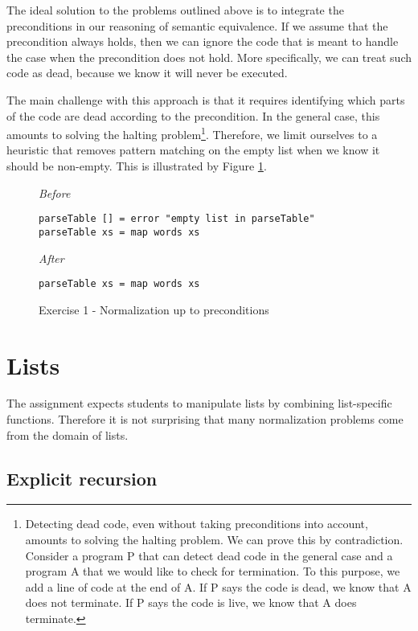 The ideal solution to the problems outlined above is to integrate the preconditions in our reasoning of semantic equivalence. If we assume that the precondition always holds, then we can ignore the code that is meant to handle the case when the precondition does not hold. More specifically, we can treat such code as dead, because we know it will never be executed.

The main challenge with this approach is that it requires identifying which parts of the code are dead according to the precondition. In the general case, this amounts to solving the halting problem\footnote{Detecting dead code, even without taking preconditions into account, amounts to solving the halting problem. We can prove this by contradiction. Consider a program P that can detect dead code in the general case and a program A that we would like to check for termination. To this purpose, we add a line of code at the end of A. If P says the code is dead, we know that A does not terminate. If P says the code is live, we know that A does terminate.}. Therefore, we limit ourselves to a heuristic that removes pattern matching on the empty list when we know it should be non-empty. This is illustrated by Figure \ref{fig:preconditions-remove-base-case}.

\begin{figure}
\centering
\emph{Before}
\begin{verbatim}
parseTable [] = error "empty list in parseTable"
parseTable xs = map words xs
\end{verbatim}
\bigskip
\emph{After}
\begin{verbatim}
parseTable xs = map words xs
\end{verbatim}
\caption{Exercise 1 - Normalization up to preconditions}
\label{fig:preconditions-remove-base-case}
\end{figure}

\section{Lists}

The assignment expects students to manipulate lists by combining list-specific functions. Therefore it is not surprising that many normalization problems come from the domain of lists.

\subsection{Explicit recursion}

